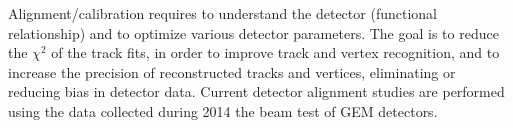 Alignment/calibration requires to understand the detector (functional relationship) and to optimize various detector  parameters.
The goal is to reduce the $\chi^{2}$ of the track fits, in order to improve track and vertex recognition, and to increase the precision of reconstructed tracks and vertices, eliminating or reducing bias in detector data.
Current detector alignment studies are performed using the data collected during 2014 the beam test of GEM detectors. 
